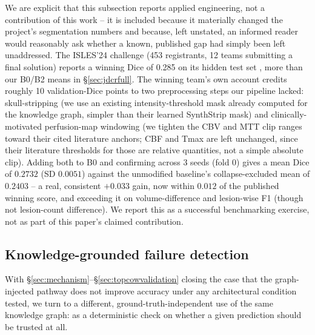 We are explicit that this subsection reports applied engineering, not a contribution of this work -- it is included because it materially changed the project's segmentation numbers and because, left unstated, an informed reader would reasonably ask whether a known, published gap had simply been left unaddressed. The ISLES'24 challenge (453 registrants, 12 teams submitting a final solution) reports a winning Dice of 0.285 on its hidden test set \cite{kurtlab2026}, more than our B0/B2 means in \S\ref{sec:jdcrfull}. The winning team's own account credits roughly 10 validation-Dice points to two preprocessing steps our pipeline lacked: skull-stripping (we use an existing intensity-threshold mask already computed for the knowledge graph, simpler than their learned SynthStrip mask) and clinically-motivated perfusion-map windowing (we tighten the CBV and MTT clip ranges toward their cited literature anchors; CBF and Tmax are left unchanged, since their literature thresholds for those are relative quantities, not a simple absolute clip). Adding both to B0 and confirming across 3 seeds (fold 0) gives a mean Dice of $0.2732$ (SD $0.0051$) against the unmodified baseline's collapse-excluded mean of $0.2403$ -- a real, consistent $+0.033$ gain, now within $0.012$ of the published winning score, and exceeding it on volume-difference and lesion-wise F1 (though not lesion-count difference). We report this as a successful benchmarking exercise, not as part of this paper's claimed contribution.


\subsection{Knowledge-grounded failure detection}
\label{sec:faildetect}

With \S\ref{sec:mechanism}--\S\ref{sec:topcowvalidation} closing the case that the graph-injected pathway does not improve accuracy under any architectural condition tested, we turn to a different, ground-truth-independent use of the same knowledge graph: as a deterministic check on whether a given prediction should be trusted at all.

